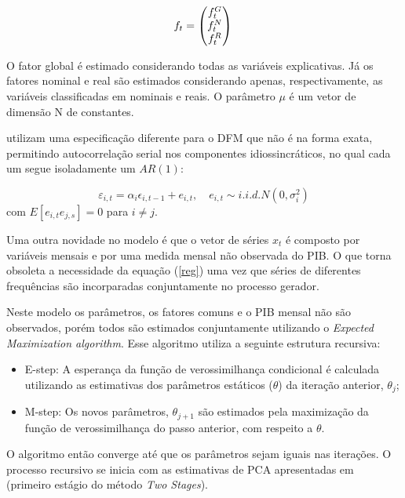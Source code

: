 \documentclass{article}
\begin{document}
\begin{enumerate}
\begin{equation}
f_t = \begin{pmatrix}
  f_t^G \\
  f_t^N \\
  f_t^R
\end{pmatrix}\\
\end{equation}


O fator global é estimado considerando todas as variáveis explicativas. Já os fatores nominal e real são estimados considerando apenas, respectivamente, as variáveis classificadas em nominais e reais. O parâmetro $\mu$ é um vetor de dimensão N de constantes.

\cite{banburaetal2011} utilizam uma especificação diferente para o DFM que não é na forma exata, permitindo autocorrelação serial nos componentes idiossincráticos, no qual cada um segue isoladamente um $AR(1)$:

\begin{equation}
\varepsilon_{i,t} = \alpha_i \epsilon_{i,t-1} + e_{i,t}, \quad e_{i,t} \sim i.i.d. N(0,\sigma_i^2)
\end{equation}
com $E[e_{i,t} e_{j,s}] = 0$ para $i \neq j$.

Uma outra novidade no modelo é que o vetor de séries $x_t$ é composto por variáveis mensais e por uma medida mensal não observada do PIB. O que torna obsoleta a necessidade da equação (\ref{reg}) uma vez que séries de diferentes frequências são incorparadas conjuntamente no processo gerador.

Neste modelo os parâmetros, os fatores comuns e o PIB mensal não são observados, porém todos são estimados conjuntamente utilizando o \emph{Expected Maximization algorithm}. Esse algoritmo utiliza a seguinte estrutura recursiva:

\begin{itemize}
\item E-step: A esperança da função de verossimilhança condicional é calculada utilizando as estimativas dos parâmetros estáticos ($\theta$) da iteração anterior, $\theta_j$;
\item M-step: Os novos parâmetros, $\theta_{j+1}$ são estimados pela maximização da função de verossimilhança do passo anterior, com respeito a $\theta$.
\end{itemize}

O algoritmo então converge até que os parâmetros sejam iguais nas iterações. O processo recursivo se inicia com as estimativas de PCA apresentadas em \cite{giannoneetal2008} (primeiro estágio do método \textit{Two Stages}).

\end{enumerate}
\end{document}
